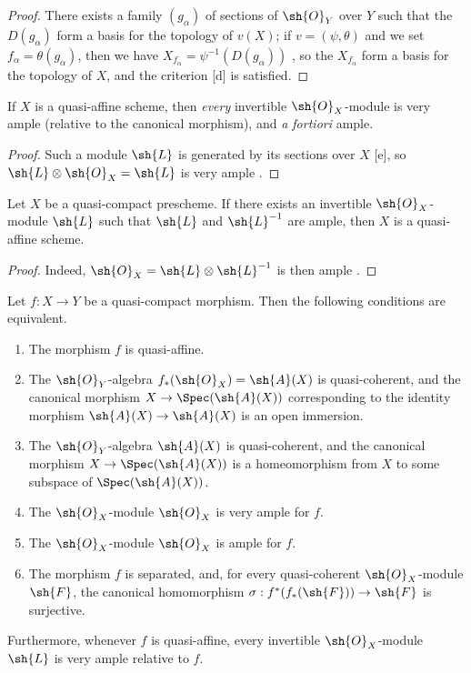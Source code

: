 \begin{proof}
There exists a family $(g_\alpha)$ of sections of $\sh{O}_Y$ over $Y$ such that the $D(g_\alpha)$ form a basis for the topology of $v(X)$;
if $v=(\psi,\theta)$ and we set $f_\alpha=\theta(g_\alpha)$, then we have $X_{f_\alpha}=\psi^{-1}(D(g_\alpha))$ , so the $X_{f_\alpha}$ form a basis for the topology of $X$, and the criterion [d] is satisfied.
\end{proof}

\begin{corollary}[5.1.4]
\label{II.5.1.4}
If $X$ is a quasi-affine scheme, then \emph{every} invertible $\sh{O}_X$-module is very ample (relative to the canonical morphism), and \emph{a fortiori} ample.
\end{corollary}

\begin{proof}
Such a module $\sh{L}$ is generated by its sections over $X$ [e], so $\sh{L}\otimes\sh{O}_X=\sh{L}$ is very ample .
\end{proof}

\begin{corollary}[5.1.5]
\label{II.5.1.5}
Let $X$ be a quasi-compact prescheme.
If there exists an invertible $\sh{O}_X$-module $\sh{L}$ such that $\sh{L}$ and $\sh{L}^{-1}$ are ample, then $X$ is a quasi-affine scheme.
\end{corollary}

\begin{proof}
Indeed, $\sh{O}_X=\sh{L}\otimes\sh{L}^{-1}$ is then ample .
\end{proof}

\begin{proposition}[5.1.6]
\label{II.5.1.6}
Let $f:X\to Y$ be a quasi-compact morphism.
Then the following conditions are equivalent.
\begin{enumerate}
  \item[{\rm(a)}] The morphism $f$ is quasi-affine.
  \item[{\rm(b)}] The $\sh{O}_Y$-algebra $f_*(\sh{O}_X)=\sh{A}(X)$ is quasi-coherent, and the canonical morphism $X\to\Spec(\sh{A}(X))$ corresponding to the identity morphism $\sh{A}(X)\to\sh{A}(X)$  is an open immersion.
  \item[{\rm(b')}] The $\sh{O}_Y$-algebra $\sh{A}(X)$ is quasi-coherent, and the canonical morphism $X\to\Spec(\sh{A}(X))$ is a homeomorphism from $X$ to some subspace of $\Spec(\sh{A}(X))$.
  \item[{\rm(c)}] The $\sh{O}_X$-module $\sh{O}_X$ is very ample for $f$.
  \item[{\rm(c')}] The $\sh{O}_X$-module $\sh{O}_X$ is ample for $f$.
  \item[{\rm(d)}] The morphism $f$ is separated, and, for every quasi-coherent $\sh{O}_X$-module $\sh{F}$, the canonical homomorphism $\sigma:f^*(f_*(\sh{F}))\to\sh{F}$  is surjective.
\end{enumerate}

Furthermore, whenever $f$ is quasi-affine, every invertible $\sh{O}_X$-module $\sh{L}$ is very ample relative to $f$.
\end{proposition}

